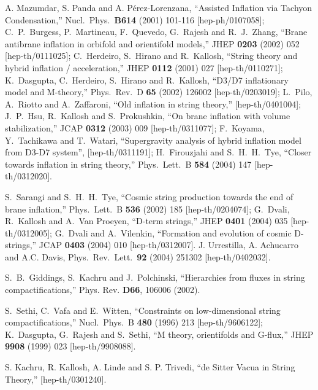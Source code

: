 \documentclass[12pt]{JHEP3}
\begin{document}
\begin{thebibliography}{4}
A. Mazumdar, S. Panda and A. P\'erez-Lorenzana, ``Assisted
Inflation via Tachyon Condensation,'' Nucl.\ Phys.\ {\bf B614}
(2001) 101-116 [hep-ph/0107058];
%
C.~P.~Burgess, P.~Martineau, F.~Quevedo, G.~Rajesh and
R.~J.~Zhang, ``Brane antibrane inflation in orbifold and
orientifold models,'' JHEP {\bf 0203} (2002) 052 [hep-th/0111025];
%
C.~Herdeiro, S.~Hirano and R.~Kallosh, ``String theory and hybrid
inflation / acceleration,'' JHEP {\bf 0112} (2001) 027
[hep-th/0110271];
%
K.~Dasgupta, C.~Herdeiro, S.~Hirano and R.~Kallosh, ``D3/D7
inflationary model and M-theory,'' Phys.\ Rev.\ D {\bf 65} (2002)
126002 [hep-th/0203019];
%
L.~Pilo, A.~Riotto and A.~Zaffaroni, ``Old inflation in string
theory,'' [hep-th/0401004];
%
J.~P.~Hsu, R.~Kallosh and S.~Prokushkin, ``On brane inflation with
volume stabilization,'' JCAP {\bf 0312} (2003) 009
[hep-th/0311077];
%
F.~Koyama, Y.~Tachikawa and T.~Watari, ``Supergravity analysis of
hybrid inflation model from D3-D7 system'', [hep-th/0311191];
%
H.~Firouzjahi and S.~H.~H.~Tye, ``Closer towards inflation in
string theory,'' Phys.\ Lett.\ B {\bf 584} (2004) 147
[hep-th/0312020].

S.~Sarangi and S.~H.~H.~Tye, ``Cosmic string production towards
the end of brane inflation,'' Phys.\ Lett.\ B {\bf 536} (2002) 185
[hep-th/0204074];
%
G.~Dvali, R.~Kallosh and A.~Van Proeyen, ``D-term strings,'' JHEP
{\bf 0401} (2004) 035 [hep-th/0312005];
%
G.~Dvali and A.~Vilenkin, ``Formation and evolution of cosmic
D-strings,'' JCAP {\bf 0403} (2004) 010 [hep-th/0312007].
%
J. Urrestilla, A. Achucarro and A.C. Davis, Phys.\ Rev.\ Lett.\
{\bf 92} (2004) 251302 [hep-th/0402032].

S.~B.~Giddings, S.~Kachru and J.~Polchinski, ``Hierarchies from
fluxes in string compactifications,'' Phys. Rev. {\bf D66}, 106006
(2002).

S.~Sethi, C.~Vafa and E.~Witten, ``Constraints on low-dimensional
string compactifications,'' Nucl.\ Phys.\ B {\bf 480} (1996) 213
[hep-th/9606122];
%
K.~Dasgupta, G.~Rajesh and S.~Sethi, ``M theory, orientifolds and
G-flux,'' JHEP {\bf 9908} (1999) 023 [hep-th/9908088].

S. Kachru, R. Kallosh, A. Linde and S. P. Trivedi, ``de Sitter
Vacua in String Theory,'' [hep-th/0301240].


\end{thebibliography}
\end{document}

